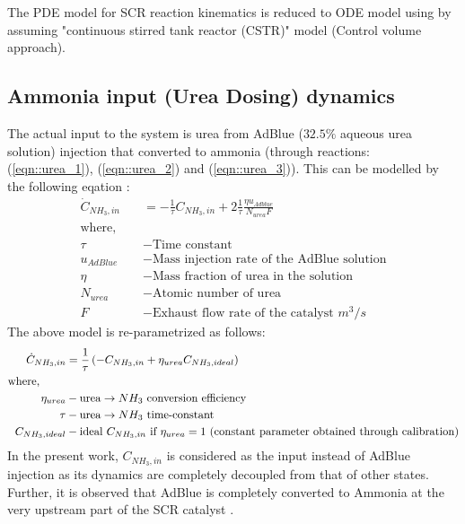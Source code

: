 The PDE model for SCR reaction kinematics \cite{nova2014urea} is reduced to ODE model \cite{devarakonda2008adequacy} using by assuming "continuous stirred tank reactor (CSTR)" model (Control volume approach).

\subsection{Ammonia input (Urea Dosing) dynamics}
The actual input to the system is urea from AdBlue ($32.5\%$ aqueous urea
solution) injection that converted to ammonia (through reactions:
(\ref{eqn::urea_1}), (\ref{eqn::urea_2}) and (\ref{eqn::urea_3})). This can be modelled by the following eqation \cite{nova2014urea}:
\begin{align*}
    \dot C_{NH_3, in} &= - \frac{1}{\tau} C_{NH_3, in} + 2 \frac{1}{\tau} \frac{ \eta u_{Adblue}}{N_{urea} F}\\
    \text{where, } \quad &\\
    \tau &- \text{Time constant}\\
    u_{AdBlue} &- \text{Mass injection rate of the AdBlue solution}\\
    \eta &- \text{Mass fraction of urea in the solution}\\
    N_{urea} &- \text{Atomic number of urea}\\
    F &- \text{Exhaust flow rate of the catalyst } m^3/s
\end{align*}
The above model is re-parametrized as follows:
\begin{align*}
    \dot C_{NH_3, in} &= \frac{1}{\tau} \left(  -C_{NH_3, in} +\eta_{urea} C_{NH_3, ideal} \right) \\
    \text{where, }\qquad &\\
    \eta_{urea} &- \text{urea} \rightarrow NH_3 \text{ conversion efficiency}\\
    \tau &- \text{urea} \rightarrow NH_3 \text{ time-constant}\\
    C_{NH_3, ideal} &- \text{ideal $C_{NH_3, in}$ if $\eta_{urea} = 1$ (constant parameter obtained through calibration)}
\end{align*}
In the present work, $C_{NH_3, in}$ is considered as the input instead of AdBlue
injection as its dynamics are completely decoupled from that of other states.
Further, it is observed that AdBlue is completely converted to Ammonia at the
very upstream part of the SCR catalyst \cite{hsieh2011development}.


%
